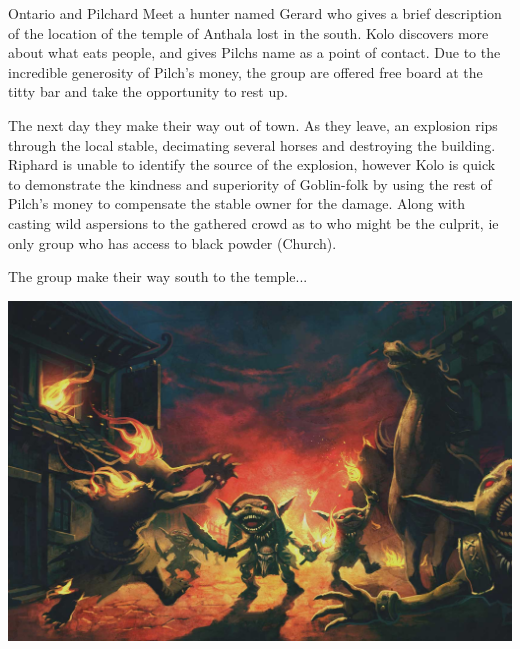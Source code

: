 \begin{multicols}{2}
Ontario and Pilchard Meet a hunter named Gerard who gives a brief description of the location of the temple of Anthala lost in the south. Kolo discovers more about what eats people, and gives Pilchs name as a point of contact. Due to the incredible generosity of Pilch’s money, the group are offered free board at the titty bar and take the opportunity to rest up.\medskip

The next day they make their way out of town. As they leave, an explosion rips through the local stable, decimating several horses and destroying the building. Riphard is unable to identify the source of the explosion, however Kolo is quick to demonstrate the kindness and superiority of Goblin-folk by using the rest of Pilch’s money to compensate the stable owner for the damage. Along with casting wild aspersions to the gathered crowd as to who might be the culprit, ie only group who has access to black powder (Church).\medskip

The group make their way south to the temple...\medskip


\end{multicols}


\vspace*{5mm}

\begin{center}
\includegraphics[width=\textwidth]{./content/img/goblin9.jpg}
\begin{figure}[h]
\end{figure}
\end{center}

\clearpage
